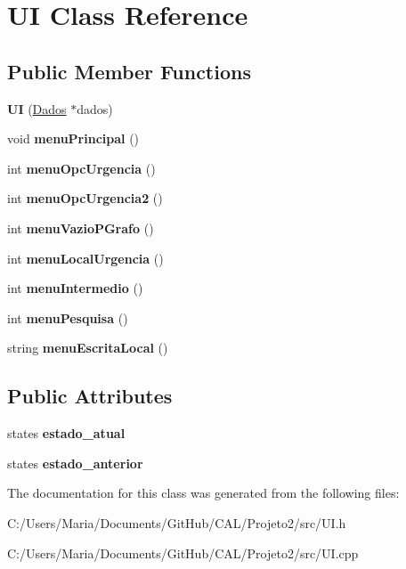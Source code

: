 \hypertarget{class_u_i}{}\section{UI Class Reference}
\label{class_u_i}
\subsection*{Public Member Functions}
\begin{DoxyCompactItemize}
\item 
\hypertarget{class_u_i_ac974e568f70fbc571a1f9c2d6b6cbc86}{}\label{class_u_i_ac974e568f70fbc571a1f9c2d6b6cbc86} 
{\bfseries UI} (\hyperlink{class_dados}{Dados} $\ast$dados)
\item 
\hypertarget{class_u_i_ac8b4237429a4210a48b64c05888c2e59}{}\label{class_u_i_ac8b4237429a4210a48b64c05888c2e59} 
void {\bfseries menu\+Principal} ()
\item 
\hypertarget{class_u_i_a02d83eab2f7cc38dd230f7affae0aab3}{}\label{class_u_i_a02d83eab2f7cc38dd230f7affae0aab3} 
int {\bfseries menu\+Opc\+Urgencia} ()
\item 
\hypertarget{class_u_i_a2fdb860ed265a434142c746cc94ee1fd}{}\label{class_u_i_a2fdb860ed265a434142c746cc94ee1fd} 
int {\bfseries menu\+Opc\+Urgencia2} ()
\item 
\hypertarget{class_u_i_a80d1a83061bbdba52aa2eb119ec900bc}{}\label{class_u_i_a80d1a83061bbdba52aa2eb119ec900bc} 
int {\bfseries menu\+Vazio\+P\+Grafo} ()
\item 
\hypertarget{class_u_i_aaee26714eb729fec00b6ee496e009f3f}{}\label{class_u_i_aaee26714eb729fec00b6ee496e009f3f} 
int {\bfseries menu\+Local\+Urgencia} ()
\item 
\hypertarget{class_u_i_a2b6aa935c1ecc05befbca917e682dbc7}{}\label{class_u_i_a2b6aa935c1ecc05befbca917e682dbc7} 
int {\bfseries menu\+Intermedio} ()
\item 
\hypertarget{class_u_i_a0adc7f1bbd8e6f2df7260c9ac2987cf5}{}\label{class_u_i_a0adc7f1bbd8e6f2df7260c9ac2987cf5} 
int {\bfseries menu\+Pesquisa} ()
\item 
\hypertarget{class_u_i_af91552eb6cecf5c50c1b35c9db5ac386}{}\label{class_u_i_af91552eb6cecf5c50c1b35c9db5ac386} 
string {\bfseries menu\+Escrita\+Local} ()
\end{DoxyCompactItemize}
\subsection*{Public Attributes}
\begin{DoxyCompactItemize}
\item 
\hypertarget{class_u_i_ac2d8ad0b755434f55caea1a87d89ac6d}{}\label{class_u_i_ac2d8ad0b755434f55caea1a87d89ac6d} 
states {\bfseries estado\+\_\+atual}
\item 
\hypertarget{class_u_i_accf4989e37d4423b197ce1bdd5a8d5b9}{}\label{class_u_i_accf4989e37d4423b197ce1bdd5a8d5b9} 
states {\bfseries estado\+\_\+anterior}
\end{DoxyCompactItemize}


The documentation for this class was generated from the following files\+:\begin{DoxyCompactItemize}
\item 
C\+:/\+Users/\+Maria/\+Documents/\+Git\+Hub/\+C\+A\+L/\+Projeto2/src/U\+I.\+h\item 
C\+:/\+Users/\+Maria/\+Documents/\+Git\+Hub/\+C\+A\+L/\+Projeto2/src/U\+I.\+cpp\end{DoxyCompactItemize}
